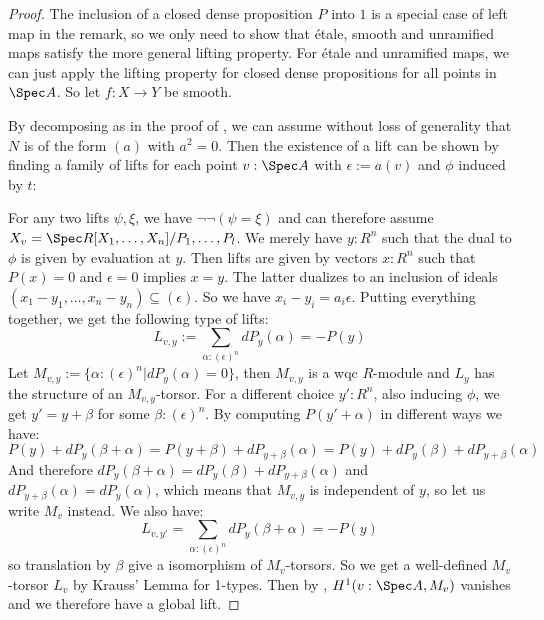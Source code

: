 \begin{proof}
  The inclusion of a closed dense proposition $P$ into $1$ is a special case of left map in the remark, so we only need to show that étale,
  smooth and unramified maps satisfy the more general lifting property. For étale and unramified maps, we can just apply the lifting property for closed dense propositions for all points in $\Spec A$. So let $f:X\to Y$ be smooth.
  
  By decomposing as in the proof of , we can assume without loss of generality that $N$ is of the form $(a)$ with $a^2=0$.
  Then the existence of a lift can be shown
  by finding a family of lifts for each point $v:\Spec A$ with $\epsilon:=a(v)$ and $\phi$ induced by $t$:
  \begin{center}
  \end{center}
  For any two lifts $\psi,\xi$, we have $\neg\neg(\psi=\xi)$
  and can therefore assume $X_v=\Spec R[X_1,\dots,X_n]/P_1,\dots,P_l$.
  We merely have $y:R^n$ such that the dual to $\phi$ is given by evaluation at $y$.
  Then lifts are given by vectors $x:R^n$ such that $P(x)=0$ and $\epsilon = 0$ implies $x=y$.
  The latter dualizes to an inclusion of ideals $(x_1-y_1,\dots,x_n-y_n)\subseteq (\epsilon)$.
  So we have $x_i-y_i=a_i\epsilon$.
  Putting everything together, we get the following type of lifts:
  \[L_{v,y}:=\sum_{\alpha:(\epsilon)^n}dP_y(\alpha)=-P(y) \]
  Let $M_{v,y}:=\{\alpha:(\epsilon)^n\vert dP_y(\alpha)=0\}$, then  $M_{v,y}$ is a wqc $R$-module and $L_y$ has the structure of an $M_{v,y}$-torsor.
  For a different choice $y':R^n$, also inducing $\phi$, we get $y'=y+\beta$ for some $\beta:(\epsilon)^n$.
  By computing $P(y'+\alpha)$ in different ways we have:
  \[P(y)+dP_y(\beta+\alpha)=P(y+\beta)+dP_{y+\beta}(\alpha)=P(y)+dP_y(\beta)+dP_{y+\beta}(\alpha)\]
  And therefore $dP_y(\beta+\alpha)=dP_y(\beta)+dP_{y+\beta}(\alpha)$ and $dP_{y+\beta}(\alpha)=dP_y(\alpha)$, which means that $M_{v,y}$ is independent of $y$, so let us write $M_v$ instead.
  We also have:
  \[L_{v,y'}=\sum_{\alpha:(\epsilon)^n}dP_y(\beta+\alpha)=-P(y)\]
  so translation by $\beta$ give a isomorphism of $M_{v}$-torsors.
  So we get a well-defined $M_v$-torsor $L_v$ by Krauss' Lemma for 1-types.
  Then by \cite{draft}, $H^1(v:\Spec A, M_v)$ vanishes and we therefore have a global lift. 
\end{proof}

